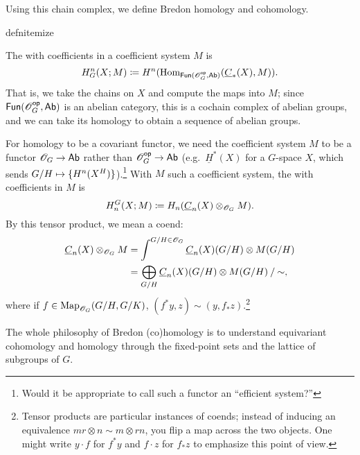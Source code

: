 Using this chain complex, we define Bredon homology and cohomology.
\begin{comp}{defn}{itemize}
	\item The  with coefficients in a coefficient system $M$ is
	\[H_G^n(X;M) \coloneqq H^n(\operatorname{Hom}_{\mathsf{Fun}(\mathscr O_G^{\mathsf{op}}, \mathsf{Ab})}(\underline C_*(X), M)).\]
	That is, we take the chains on $X$ and compute the maps into $M$; since $\mathsf{Fun}(\mathscr O_G^{\mathsf{op}},\mathsf{Ab})$ is an abelian
	category, this is a cochain complex of abelian groups, and we can take its homology to obtain a sequence of
	abelian groups.
	\item For homology to be a covariant functor, we need the coefficient system $M$ to be a functor $\mathscr O_G\to\mathsf{Ab}$
	rather than $\mathscr O_G^{\mathsf{op}}\to\mathsf{Ab}$ (e.g.\ $\underline H^*(X)$ for a $G$-space $X$, which sends
	$G/H\mapsto\set{H^n(X^H)}$).\footnote{Would it be appropriate to call such a functor an ``efficient system?''}
	With $M$ such a coefficient system, the  with coefficients in $M$ is
	\[H_n^G(X; M) \coloneqq H_n(\underline C_n(X)\otimes_{\mathscr O_G} M).\]
	By this tensor product, we mean a coend:
	\begin{align*}
	\underline C_n(X)\otimes_{\mathscr O_G} M &= \int^{G/H\in \mathscr O_G} \underline C_n(X)(G/H)\otimes M(G/H)\\
	&= \bigoplus_{G/H} {\underline C_n(X)(G/H)\otimes M(G/H)} \mathbin/ {\mathord\sim},
	\end{align*}
	where if $f\in\operatorname{Map}_{\mathscr O_G}(G/H, G/K)$, $(f^*y, z)\sim (y, f_*z)$.\footnote{Tensor products are particular
	instances of coends; instead of inducing an equivalence $mr\otimes n\sim m\otimes rn$, you flip a map across
	the two objects. One might write $y\cdot f$ for $f^* y$ and $f\cdot z$ for $f_* z$ to emphasize this point of
	view.}
\end{comp}
The whole philosophy of Bredon (co)homology is to understand equivariant cohomology and homology through the
fixed-point sets and the lattice of subgroups of $G$.

